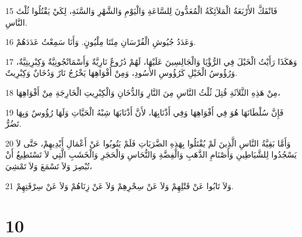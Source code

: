 \par 15 فَانْفَكَّ الأَرْبَعَةُ الْمَلاَئِكَةُ الْمُعَدُّونَ لِلسَّاعَةِ وَالْيَوْمِ وَالشَّهْرِ وَالسَّنَةِ، لِكَيْ يَقْتُلُوا ثُلْثَ النَّاسِ.
\par 16 وَعَدَدُ جُيُوشِ الْفُرْسَانِ مِئَتَا مِلْيُونٍ. وَأَنَا سَمِعْتُ عَدَدَهُمْ.
\par 17 وَهَكَذَا رَأَيْتُ الْخَيْلَ فِي الرُّؤْيَا وَالْجَالِسِينَ عَلَيْهَا، لَهُمْ دُرُوعٌ نَارِيَّةٌ وَأَسْمَانْجُونِيَّةٌ وَكِبْرِيتِيَّةٌ، وَرُؤُوسُ الْخَيْلِ كَرُؤُوسِ الأُسُودِ، وَمِنْ أَفْوَاهِهَا يَخْرُجُ نَارٌ وَدُخَانٌ وَكِبْرِيتٌ.
\par 18 مِنْ هَذِهِ الثَّلاَثَةِ قُتِلَ ثُلْثُ النَّاسِ مِنَ النَّارِ وَالدُّخَانِ وَالْكِبْرِيتِ الْخَارِجَةِ مِنْ أَفْوَاهِهَا،
\par 19 فَإِنَّ سُلْطَانَهَا هُوَ فِي أَفْوَاهِهَا وَفِي أَذْنَابِهَا، لأَنَّ أَذْنَابَهَا شِبْهُ الْحَيَّاتِ وَلَهَا رُؤُوسٌ وَبِهَا تَضُرُّ.
\par 20 وَأَمَّا بَقِيَّةُ النَّاسِ الَّذِينَ لَمْ يُقْتَلُوا بِهَذِهِ الضَّرَبَاتِ فَلَمْ يَتُوبُوا عَنْ أَعْمَالِ أَيْدِيهِمْ، حَتَّى لاَ يَسْجُدُوا لِلشَّيَاطِينِ وَأَصْنَامِ الذَّهَبِ وَالْفِضَّةِ وَالنُّحَاسِ وَالْحَجَرِ وَالْخَشَبِ الَّتِي لاَ تَسْتَطِيعُ أَنْ تُبْصِرَ وَلاَ تَسْمَعَ وَلاَ تَمْشِيَ،
\par 21 وَلاَ تَابُوا عَنْ قَتْلِهِمْ وَلاَ عَنْ سِحْرِهِمْ وَلاَ عَنْ زِنَاهُمْ وَلاَ عَنْ سِرْقَتِهِمْ.

\chapter{10}

